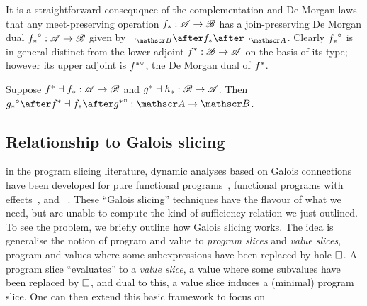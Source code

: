 It is a straightforward consequqnce of the complementation and De Morgan laws that any meet-preserving operation ${f}_*: \mathscr{A} \to \mathscr{B}$ has a join-preserving De Morgan dual ${{f}_*}^{\circ}: \mathscr{A} \to \mathscr{B}$ given by $\neg_{\Ann{B}} \after \upperAdj{f} \after \neg_{\Ann{A}}$. Clearly ${{f}_*}^{\circ}$ is in general distinct from the lower adjoint ${f}^*: \mathscr{B} \to \mathscr{A}$ on the basis of its type; however its upper adjoint is ${{f}^*}^{\circ}$, the De Morgan dual of ${f}^*$.

\begin{lemma}
   Suppose ${f}^* \dashv {f}_*: \mathscr{A} \to \mathscr{B}$ and ${g}^* \dashv {h}_*: \mathscr{B} \to \mathscr{A}$. Then $\dual{\upperAdj{g}} \after \lowerAdj{f} \adjoint \upperAdj{f} \after \dual{\lowerAdj{g}}: \Ann{A} \to \Ann{B}$.
\end{lemma}

\begin{nscenter}
\end{nscenter}

\subsection{Relationship to Galois slicing}

in the program slicing literature, dynamic analyses based on Galois connections have been developed for pure functional programs~\cite{perera12a}, functional programs with effects~\cite{ricciotti17}, and \piCalculus~\cite{perera16d}. These ``Galois slicing'' techniques have the flavour of what we need, but are unable to compute the kind of sufficiency relation we just outlined. To see the problem, we briefly outline how Galois slicing works. The idea is generalise the notion of program and value to \emph{program slices} and \emph{value slices}, program and values where some subexpressions have been replaced by hole $\square$. A program slice ``evaluates'' to a \emph{value slice}, a value where some subvalues have been replaced by $\square$, and dual to this, a value slice induces a (minimal) program slice. One can then extend this basic framework to focus on

